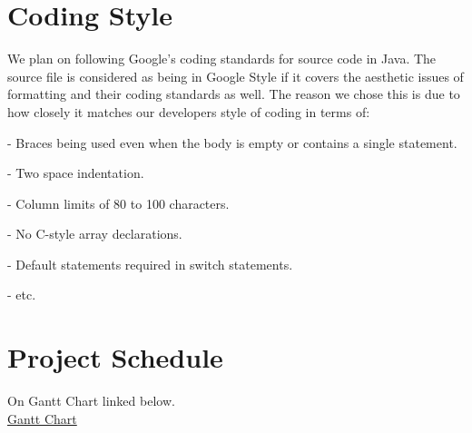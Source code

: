\documentclass{article}
\begin{document}
\section{Coding Style}
We plan on following Google's coding standards for source code in Java. The source file is considered as being in Google Style if it covers the  aesthetic issues of formatting and their coding standards as well. The reason we chose this is due to how closely it matches our developers style of coding in terms of:

- Braces being used even when the body is empty or contains a single statement.

- Two space indentation.

- Column limits of 80 to 100 characters.

- No C-style array declarations.

- Default statements required in switch statements.

- etc.

\section{Project Schedule}
On Gantt Chart linked below.\\
\href{https://gitlab.cas.mcmaster.ca/dimitn/image_processing_app/blob/master/ProjectSchedule/3XA3Gantt.pdf}{Gantt Chart}
\end{document}
